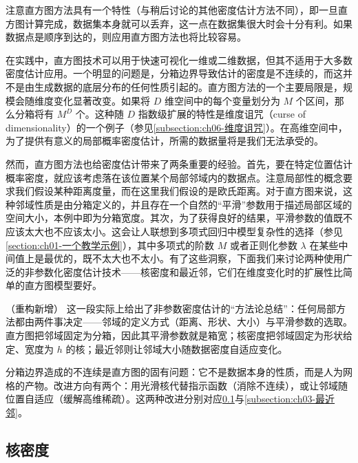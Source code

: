 \documentclass[../../main.tex]{subfiles}
\begin{document}
注意直方图方法具有一个特性（与稍后讨论的其他密度估计方法不同），即一旦直方图计算完成，数据集本身就可以丢弃，这一点在数据集很大时会十分有利。如果数据点是顺序到达的，则应用直方图方法也将比较容易。

在实践中，直方图技术可以用于快速可视化一维或二维数据，但其不适用于大多数密度估计应用。一个明显的问题是，分箱边界导致估计的密度是不连续的，而这并不是由生成数据的底层分布的任何性质引起的。直方图方法的一个主要局限是，规模会随维度变化显著改变。如果将 $D$ 维空间中的每个变量划分为 $M$ 个区间，那么分箱将有 $M^{D}$ 个。这种随 $D$ 指数级扩展的特性是维度诅咒（curse of dimensionality）的一个例子（参见\cref{subsection:ch06-维度诅咒}）。在高维空间中，为了提供有意义的局部概率密度估计，所需的数据量将是我们无法承受的。

然而，直方图方法也给密度估计带来了两条重要的经验。首先，要在特定位置估计概率密度，就应该考虑落在该位置某个局部邻域内的数据点。注意局部性的概念要求我们假设某种距离度量，而在这里我们假设的是欧氏距离。对于直方图来说，这种邻域性质是由分箱定义的，并且存在一个自然的“平滑”参数用于描述局部区域的空间大小，本例中即为分箱宽度。其次，为了获得良好的结果，平滑参数的值既不应该太大也不应该太小。这会让人联想到多项式回归中模型复杂性的选择（参见\cref{section:ch01-一个教学示例}），其中多项式的阶数 $M$ 或者正则化参数 $\lambda$ 在某些中间值上是最优的，既不太大也不太小。有了这些洞察，下面我们来讨论两种使用广泛的非参数化密度估计技术——核密度和最近邻，它们在维度变化时的扩展性比简单的直方图模型要好。

\begin{remark}（重构新增）
这一段实际上给出了非参数密度估计的“方法论总结”：任何局部方法都由两件事决定——邻域的定义方式（距离、形状、大小）与平滑参数的选取。直方图把邻域固定为分箱，因此其平滑参数就是箱宽；核密度把邻域固定为形状给定、宽度为 $h$ 的核；最近邻则让邻域大小随数据密度自适应变化。

分箱边界造成的不连续是直方图的固有问题：它不是数据本身的性质，而是人为网格的产物。改进方向有两个：用光滑核代替指示函数（消除不连续），或让邻域随位置自适应（缓解高维稀疏）。这两种改进分别对应\cref{subsection:ch03-核密度}与\cref{subsection:ch03-最近邻}。
\end{remark}

\subsection{核密度}\label{subsection:ch03-核密度}
\end{document}
